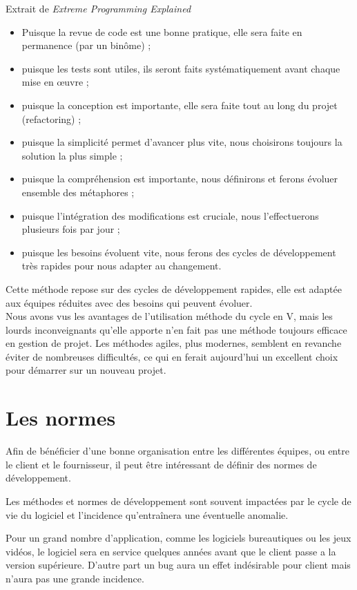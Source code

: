 Extrait de \textit{Extreme Programming Explained}
\begin{Quote}
\begin{itemize}
\item Puisque la revue de code est une bonne pratique, elle sera faite en permanence (par un binôme) ;
\item puisque les tests sont utiles, ils seront faits systématiquement avant chaque mise en œuvre ;
\item puisque la conception est importante, elle sera faite tout au long du projet (refactoring) ;
\item puisque la simplicité permet d'avancer plus vite, nous choisirons toujours la solution la plus simple ;
\item puisque la compréhension est importante, nous définirons et ferons évoluer ensemble des métaphores ;
\item puisque l'intégration des modifications est cruciale, nous l'effectuerons plusieurs fois par jour ;
\item puisque les besoins évoluent vite, nous ferons des cycles de développement très rapides pour nous adapter au changement.
\end{itemize}
\end{Quote}

Cette méthode repose sur des cycles de développement rapides, elle est adaptée aux équipes réduites avec des besoins qui peuvent évoluer.
\\
Nous avons vus les avantages de l'utilisation méthode du cycle en V, mais les lourds inconveignants qu'elle apporte n'en fait pas une méthode toujours efficace en gestion de projet. Les méthodes agiles, plus modernes, semblent en revanche éviter de nombreuses difficultés, ce qui en ferait aujourd'hui un excellent choix pour démarrer sur un nouveau projet.

\section{Les normes}

Afin de bénéficier d'une bonne organisation entre les différentes équipes, ou entre le client et le fournisseur, il peut être intéressant de définir des normes de développement.

Les méthodes et normes de développement sont souvent impactées par le cycle de vie du logiciel et l'incidence qu'entraînera une éventuelle anomalie.

Pour un grand nombre d'application, comme les logiciels bureautiques ou les jeux vidéos, le logiciel sera en service quelques années avant que le client passe a la version supérieure. D'autre part un bug aura un effet indésirable pour client mais n'aura pas une grande incidence.

